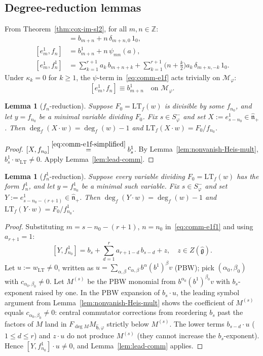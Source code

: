 \documentclass{amsart}
\newcommand{\Z}{\mathbb{Z}}
\newcommand{\g}{\mathfrak{g}}
\newcommand{\h}{\mathfrak{h}}
\newcommand{\wh}[1]{\widehat{#1}}
\newcommand{\whg}{\wh{\g}}
\newcommand{\whh}{\wh{\h}}
\newtheorem{lemma}[theorem]{Lemma}
\theoremstyle{definition}
\theoremstyle{remark}
\numberwithin{equation}{section}
\begin{document}
\subsection{Degree-reduction lemmas}
From Theorem~\ref{thm:cox-im-sl2}, for all $m,n\in\Z$:
\begin{align}
[e_m,f_n]   &=b_{m+n}+n\,\delta_{m+n,0}\,1_0,\label{eq:comm-ef}\\
[e_m^1,f_n] &=b_{m+n}^1+n\,\psi_{mn}(a),\label{eq:comm-e1f}\\
[e_m^1,f_n^1]&=\sum_{k=1}^{r+1}a_k\,b_{m+n+k}
  +\sum_{k=1}^{r+1}\!\bigl(n+\tfrac k2\bigr)a_k\,\delta_{m+n,-k}\,1_0.
  \label{eq:comm-e1f1}
\end{align}
Under $\kappa_k=0$ for $k\ge1$, the $\psi$-term in~\eqref{eq:comm-e1f}
acts trivially on $\mathcal M_\varphi$:
\begin{equation}\label{eq:comm-e1f-simplified}
[e_m^1,f_n]\equiv b_{m+n}^1\quad\text{on }\mathcal M_\varphi.
\end{equation}
\begin{lemma}[$f_n$-reduction]\label{lem:reduce-t}
Suppose $F_0=\mathrm{LT}_f(w)$ is divisible by some $f_{n_0}$, and let
$y=f_{n_0}$ be a minimal variable dividing $F_0$.  Fix $s\in S_\varphi^-$
and set $X:=e_{s-n_0}^1\in\wh{\mathfrak n}_+$.  Then
$\deg_f(X\cdot w)=\deg_f(w)-1$ and $\mathrm{LT}_f(X\cdot w)=F_0/f_{n_0}$.
\end{lemma}
\begin{proof}
$[X,f_{n_0}]\stackrel{\eqref{eq:comm-e1f-simplified}}{=}b_s^1$.
By Lemma~\ref{lem:nonvanish-Heis-mult}, $b_s^1\cdot w_{\mathrm{LT}}\neq0$.
Apply Lemma~\ref{lem:lead-comm}.
\end{proof}
\begin{lemma}[$f_n^1$-reduction]\label{lem:reduce-u}
Suppose every variable dividing $F_0=\mathrm{LT}_f(w)$ has the form
$f_n^1$, and let $y=f_{n_0}^1$ be a minimal such variable.
Fix $s\in S_\varphi^-$ and set $Y:=e_{s-n_0-(r+1)}^1\in\wh{\mathfrak n}_+$.
Then $\deg_f(Y\cdot w)=\deg_f(w)-1$ and
$\mathrm{LT}_f(Y\cdot w)=F_0/f_{n_0}^1$.
\end{lemma}
\begin{proof}
Substituting $m=s-n_0-(r+1)$, $n=n_0$ in~\eqref{eq:comm-e1f1} and
using $a_{r+1}=1$:
\begin{equation}\label{eq:Yfn0}
[Y,f_{n_0}^1]=b_s+\sum_{d=1}^{r}a_{r+1-d}\,b_{s-d}+z,
\quad z\in Z(\whg).
\end{equation}
Let $u:=w_{\mathrm{LT}}\neq0$, written as
$u=\sum_{\alpha,\beta}c_{\alpha,\beta}\,b^\alpha(b^1)^\beta v$ (PBW);
pick $(\alpha_0,\beta_0)$ with $c_{\alpha_0,\beta_0}\neq0$.  Let
$M^{(s)}$ be the PBW monomial from $b^{\alpha_0}(b^1)^{\beta_0}v$ with
$b_s$-exponent raised by one.
In the PBW expansion of $b_s\cdot u$, the leading symbol argument from
Lemma~\ref{lem:nonvanish-Heis-mult} shows the coefficient of $M^{(s)}$
equals $c_{\alpha_0,\beta_0}\neq0$: central commutator corrections from
reordering $b_s$ past the factors of $M$ land in
$F_{\deg M}M_{\whh,\varphi}$ strictly below $M^{(s)}$.  The lower
terms $b_{s-d}\cdot u$ ($1\le d\le r$) and $z\cdot u$ do not produce
$M^{(s)}$ (they cannot increase the $b_s$-exponent).  Hence
$[Y,f_{n_0}^1]\cdot u\neq0$, and Lemma~\ref{lem:lead-comm} applies.
\end{proof}
\end{document}
